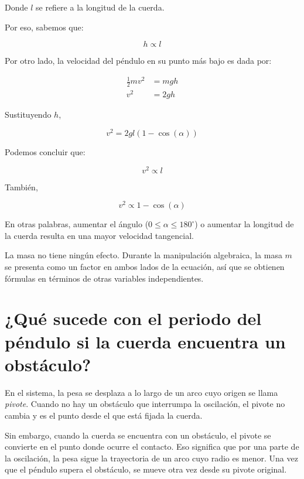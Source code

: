 \documentclass[twocolumn]{report}
\numberwithin{table}{section}
\begin{document}
Donde $l$ se refiere a la longitud de la cuerda.

Por eso, sabemos que:

\begin{equation}
  h \propto l
\end{equation}

Por otro lado, la velocidad del péndulo en su punto más bajo es dada por:

\begin{align}
  \frac{1}{2}m v^{2} &= mgh \\
  v^{2} &= 2gh
\end{align}

Sustituyendo $h$,

\begin{equation}
  v^{2} = 2gl(1 - \cos(\alpha))
\end{equation}

Podemos concluir que:

\begin{equation}
  v^{2} \propto l
\end{equation}

También,

\begin{equation}
  v^{2} \propto 1 - \cos(\alpha)
\end{equation}

En otras palabras, aumentar el ángulo ($0 \leq \alpha \leq
180^{\circ}$) o aumentar la longitud de la cuerda resulta en una
mayor velocidad tangencial.

La masa no tiene ningún efecto. Durante la manipulación algebraica,
la masa $m$ se presenta como un factor en ambos lados de la ecuación,
así que se obtienen fórmulas en términos de otras variables independientes.

\section{¿Qué sucede con el periodo del péndulo si la cuerda
encuentra un obstáculo?}

En el sistema, la pesa se desplaza a lo largo de un arco cuyo origen
se llama \emph{pivote}. Cuando no hay un obstáculo que interrumpa la
oscilación, el pivote no cambia y es el punto desde el que está
fijada la cuerda.

Sin embargo, cuando la cuerda se encuentra con un obstáculo, el
pivote se convierte en el punto donde ocurre el contacto. Eso
significa que por una parte de la oscilación, la pesa sigue la
trayectoria de un arco cuyo radio es menor. Una vez que el péndulo
supera el obstáculo, se mueve otra vez desde su pivote original.
\end{document}
